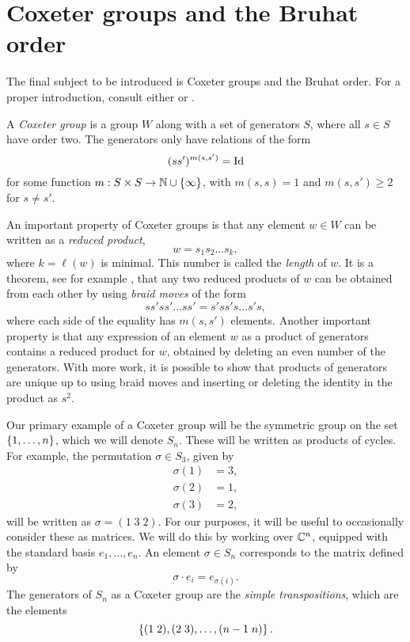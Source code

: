 \section{Coxeter groups and the Bruhat order}
\label{sec:bruhat}

The final subject to be introduced is Coxeter groups and the Bruhat
order. For a proper introduction, consult either \cite{bjorner} or
\cite{hiller}.

\begin{definition}
  A \textit{Coxeter group} is a group $W$ along with a set of
  generators $S$,
  where all $s \in S$ have order two. The generators only have
  relations of the form
  \[ (s s')^{m(s,s')} = \operatorname{Id} \]
  for some function $m : S \times S \to \mathbb{N}\cup\left\{ \infty \right\}$, with
  $m(s,s) = 1$ and $m(s,s') \geq 2$ for $s\neq s'$.
\end{definition}

An important property of Coxeter groups is that any element $w \in W$
can be written as a \textit{reduced product},
\[ w = s_1 s_2 \dots s_k, \]
where $k = \ell(w)$ is minimal. This number is called the
\textit{length} of $w$. It is a theorem, see for example \cite[Chapter
1.5]{bjorner}, that any two reduced products of $w$ can be obtained
from each other by using \textit{braid moves} of the form
\[ s s' s s' \dots s s' = s' s s' s \dots s' s, \]
where each side of the equality has $m(s,s')$ elements. Another
important property is that any expression of an element $w$ as a
product of generators contains a reduced product for $w$, obtained by
deleting an even number of the generators. With more
work, it is possible to show that products of generators are unique up
to using braid moves and inserting or deleting the identity in the
product as $s^2$.

Our primary example of a Coxeter group will be the
symmetric group on the set $\left\{ 1,\dots,n \right\}$, which we will denote
$S_n$. These will be written as products of cycles. For example, the
permutation $\sigma\in S_3$, given by
\begin{align*}
  \sigma(1) &= 3, \\
  \sigma(2) &= 1, \\
  \sigma(3) &= 2,
\end{align*}
will be written as $\sigma = (1 \; 3 \; 2)$.
For our purposes, it will be useful to occasionally consider
these as
matrices. We will do this by working over $\mathbb{C}^n$, equipped with the
standard basis $e_1,\dots,e_n$. An element $\sigma \in S_n$
corresponds to the matrix defined by
\[ \sigma \cdot e_i = e_{\sigma(i)}. \]
The generators of $S_n$ as a Coxeter group are the \textit{simple
  transpositions}, which are the elements
\[ \left\{ (1\; 2), (2\; 3), \dots, (n-1 \; n)  \right\}. \]

